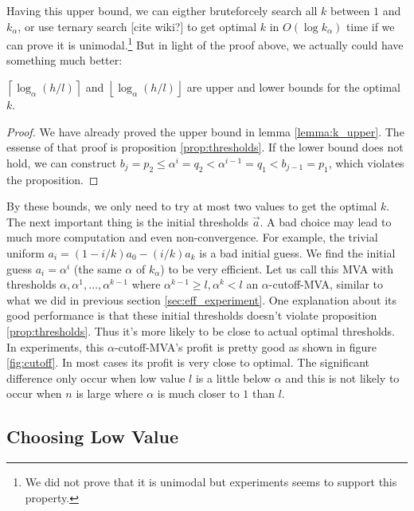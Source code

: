 Having this upper bound, we can eigther bruteforcely search all $k$ between $1$
and $k_\alpha$, or use ternary search [cite wiki?] to get optimal $k$ in
$O(\log k_\alpha)$ time if we can prove it is unimodal.\footnote{We did not
prove that it is unimodal but experiments seems to support this property.}
But in light of the proof above, we actually could have something much better:

\begin{theorem}\label{theorem:k_bounds}
$\left\lceil \log_{\alpha} \left(h/l\right) \right\rceil$ and 
$\left\lfloor \log_{\alpha} \left(h/l\right) \right\rfloor$ are upper
and lower bounds for the optimal $k$. 
\end{theorem}

\begin{proof}
We have already proved the upper bound in lemma \ref{lemma:k_upper}. The
essense of that proof is proposition \ref{prop:thresholds}. If the lower bound
does not hold, we can construct $b_j = p_2 \leq \alpha^i = q_2 < \alpha^{i-1} =
q_1 < b_{j-1} = p_1$, which violates the proposition. 
\end{proof}

By these bounds, we only need to try at most two values to get the optimal $k$.
The next important thing is the initial thresholds $\vec a$. A bad choice may
lead to much more computation and even non-convergence. For example, the
trivial uniform $a_i = (1-i/k)a_0 - (i/k) a_k$ is a bad initial guess. We find
the initial guess $a_i = \alpha^i$ (the same $\alpha$ of $k_\alpha$) to be very
efficient.  Let us call this MVA with thresholds $\alpha, \alpha^1, \ldots,
\alpha^{k-1}$ where $\alpha^{k-1} \geq l, \alpha^k < l$ an $\alpha$-cutoff-MVA,
similar to what we did in previous section \ref{sec:eff_experiment}.  
One explanation about its good performance is that these initial thresholds
doesn't violate proposition \ref{prop:thresholds}. Thus it's more likely to be
close to actual optimal thresholds.
In experiments, this $\alpha$-cutoff-MVA's profit is pretty good as shown
in figure \ref{fig:cutoff}. In most cases its profit is very close to optimal.
The significant difference only occur when low value $l$ is a little below
$\alpha$ and this is not likely to occur when $n$ is large where $\alpha$ is
much closer to $1$ than $l$.

\subsection{Choosing Low Value}

